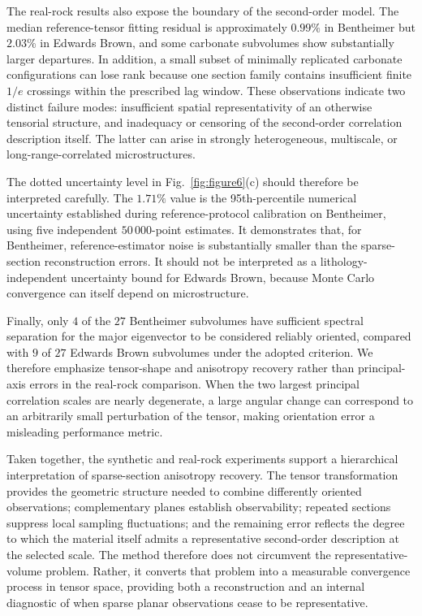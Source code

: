 \documentclass{article}
\begin{document}
The real-rock results also expose the boundary of the second-order model. The median reference-tensor fitting residual is approximately $0.99\%$ in Bentheimer but $2.03\%$ in Edwards Brown, and some carbonate subvolumes show substantially larger departures. In addition, a small subset of minimally replicated carbonate configurations can lose rank because one section family contains insufficient finite $1/e$ crossings within the prescribed lag window. These observations indicate two distinct failure modes: insufficient spatial representativity of an otherwise tensorial structure, and inadequacy or censoring of the second-order correlation description itself. The latter can arise in strongly heterogeneous, multiscale, or long-range-correlated microstructures.

The dotted uncertainty level in Fig.~\ref{fig:figure6}(c) should therefore be interpreted carefully. The $1.71\%$ value is the 95th-percentile numerical uncertainty established during reference-protocol calibration on Bentheimer, using five independent $50\,000$-point estimates. It demonstrates that, for Bentheimer, reference-estimator noise is substantially smaller than the sparse-section reconstruction errors. It should not be interpreted as a lithology-independent uncertainty bound for Edwards Brown, because Monte Carlo convergence can itself depend on microstructure.

Finally, only $4$ of the $27$ Bentheimer subvolumes have sufficient spectral separation for the major eigenvector to be considered reliably oriented, compared with $9$ of $27$ Edwards Brown subvolumes under the adopted criterion. We therefore emphasize tensor-shape and anisotropy recovery rather than principal-axis errors in the real-rock comparison. When the two largest principal correlation scales are nearly degenerate, a large angular change can correspond to an arbitrarily small perturbation of the tensor, making orientation error a misleading performance metric.

Taken together, the synthetic and real-rock experiments support a hierarchical interpretation of sparse-section anisotropy recovery. The tensor transformation provides the geometric structure needed to combine differently oriented observations; complementary planes establish observability; repeated sections suppress local sampling fluctuations; and the remaining error reflects the degree to which the material itself admits a representative second-order description at the selected scale. The method therefore does not circumvent the representative-volume problem. Rather, it converts that problem into a measurable convergence process in tensor space, providing both a reconstruction and an internal diagnostic of when sparse planar observations cease to be representative.
\end{document}
